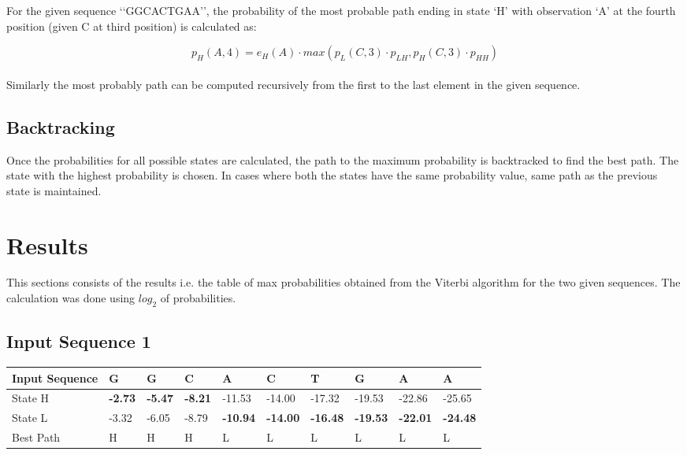 \documentclass[12pt]{article}
\begin{document}
For the given sequence \lq\lq{GGCACTGAA}\rq\rq{}, the probability of the most probable path ending in state \lq{H}\rq{} with observation \lq{A}\rq{} at the fourth position (given C at third position) is calculated as:

\begin{equation}
	p_H(A,4) = e_H(A) \cdot max(p_L(C,3) \cdot p_{LH}, p_H(C,3) \cdot p_{HH} )
\end{equation} \\

Similarly the most probably path can be computed recursively from the first to the last element in the given sequence. 

\subsection{Backtracking}
Once the probabilities for all possible states are calculated, the path to the maximum probability is backtracked to find the best path. The state with the highest probability is chosen. In cases where both the states have the same probability value, same path as the previous state is maintained. 

\section{Results}
This sections consists of the results i.e. the table of max probabilities obtained from the Viterbi algorithm for the two given sequences. The calculation was done using $log_2$ of probabilities. \\

\subsection{Input Sequence 1} 
\begin{center}
\begin{tabular}{ | m{5em} | m{3em} | m{3em} | m{3em} | m{3em} | m{3em} | m{3em} | m{3em} | m{3em} | m{3em} | }
 \hline
 Input Sequence & G & G & C & A & C & T & G & A & A \\
 \hline
 State H & \textbf{-2.73} & \textbf{-5.47} & \textbf{-8.21} & -11.53 & -14.00 & -17.32 & -19.53 & -22.86 & -25.65  \\
 \hline
 State L & -3.32 & -6.05 & -8.79 & \textbf{-10.94} & \textbf{-14.00} & \textbf{-16.48} & \textbf{-19.53} & \textbf{-22.01} & \textbf{-24.48} \\
 \hline
 Best Path & H & H & H & L & L & L & L & L & L \\
 \hline
\end{tabular}
\label{Table:1}
\end{center}
\end{document}
